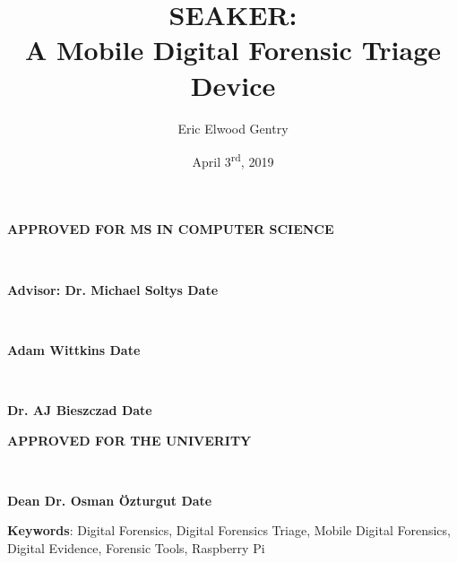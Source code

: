 \documentclass[12pt]{article}
\newcommand{\A}{\mathcal{A}}
\begin{document}
\begin{center}
{\large \bfseries APPROVED FOR MS IN COMPUTER SCIENCE \par}

\vspace{1.5 cm}

\hrulefill\\
{\large \bfseries Advisor: Dr. Michael Soltys \hfill Date \par}

\vspace{1.5 cm}

\hrulefill\\
{\large \bfseries Adam Wittkins \hfill Date \par}

\vspace{1.5 cm}

\hrulefill\\
{\large \bfseries Dr. AJ Bieszczad \hfill Date \par}

\vspace{3 cm}

{\large \bfseries APPROVED FOR THE UNIVERITY \par}

\vspace{1.5 cm}

\hrulefill\\
{\large \bfseries Dean Dr. Osman \"{O}zturgut \hfill Date \par}
\end{center}

\newpage



\newpage 

\title{SEAKER:\protect\\A Mobile Digital Forensic Triage Device}
\author{Eric Elwood Gentry}

\date{April 3\textsuperscript{rd}, 2019}
\maketitle

\small{\textbf{Keywords}: Digital Forensics, Digital Forensics Triage, Mobile Digital Forensics,
Digital Evidence, Forensic Tools, Raspberry Pi}
\\
\end{document}
